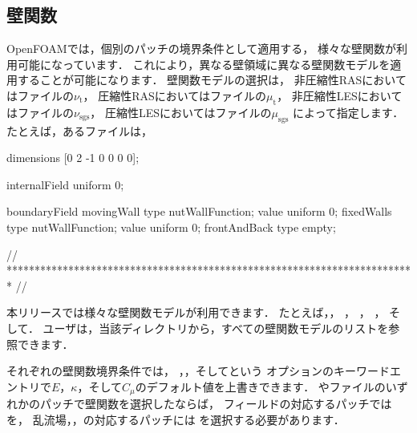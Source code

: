 \subsection{壁関数}
\label{ssec:7.2.2}
OpenFOAMでは，個別のパッチの境界条件として適用する，
様々な壁関数が利用可能になっています．
これにより，異なる壁領域に異なる壁関数モデルを適用することが可能になります．
壁関数モデルの選択は，
非圧縮性RASにおいてはファイルの$\nu_{\mathrm{t}}$，
圧縮性RASにおいてはファイルの$\mu_{\mathrm{t}}$，
非圧縮性LESにおいてはファイルの$\nu_{\mathrm{sgs}}$，
圧縮性LESにおいてはファイルの$\mu_{\mathrm{sgs}}$
によって指定します．
たとえば，あるファイルは，
\begin{OFverbatim}[file, linenum=17]

dimensions      [0 2 -1 0 0 0 0];

internalField   uniform 0;

boundaryField
{
    movingWall
    {
        type            nutWallFunction;
        value           uniform 0;
    }
    fixedWalls
    {
        type            nutWallFunction;
        value           uniform 0;
    }
    frontAndBack
    {
        type            empty;
    }
}


// ************************************************************************* //
\end{OFverbatim}
本リリースでは様々な壁関数モデルが利用できます．
たとえば，，\break
{}，
，\break
{}，
そして．
ユーザは，当該ディレクトリから，すべての壁関数モデルのリストを参照できます．

それぞれの壁関数境界条件では，
，，そしてという
オプションのキーワードエントリで$E$，$\kappa$，そして$C_{\mu}$のデフォルト値を上書きできます．
やファイルのいずれかのパッチで壁関数を選択したならば，
フィールドの対応するパッチではを，
乱流場，，の対応するパッチには
を選択する必要があります．

